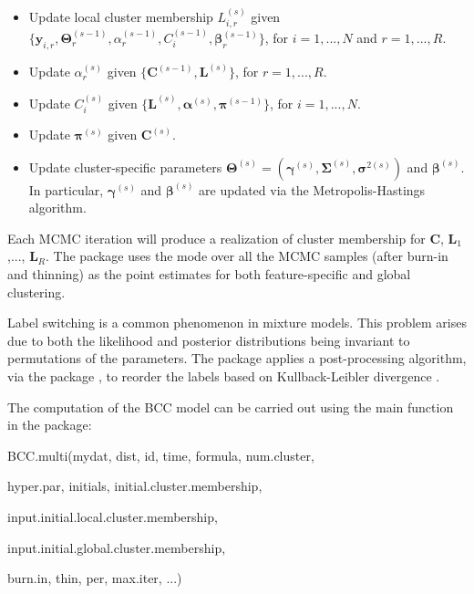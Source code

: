  \begin{itemize}

	\item Update local cluster membership $ L_{i,r}^{(s)}$ given $\{\boldsymbol{y}_{i,r}, \boldsymbol{\Theta}_r^{(s-1)}, \alpha_r^{(s-1)}, C_i^{(s-1)}, \boldsymbol{\beta}_r^{(s-1)} \}$, for $i=1,...,N$ and  $r=1,...,R$.

	\item Update $\alpha_r^{(s)}$ given $\{ \boldsymbol{C}^{(s-1)}, \boldsymbol{L}^{(s)} \}$, for $r=1,...,R$.

	\item Update $ C_i^{(s)}$ given $\{ \boldsymbol{L}^{(s)},  \boldsymbol{\alpha}^{(s)}, \boldsymbol{\pi}^{(s-1)}\}$, for $i=1,...,N$.

	\item Update $\boldsymbol{\pi}^{(s)}$ given $ \boldsymbol{C}^{(s)}$.

	\item Update cluster-specific parameters $\boldsymbol{\Theta}^{(s)} = (\boldsymbol{\gamma}^{(s)},\boldsymbol{\Sigma}^{(s)}, \boldsymbol{\sigma}^{2(s)})$ and  $\boldsymbol{\beta}^{(s)}$. In particular, $\boldsymbol{\gamma}^{(s)}$ and $\boldsymbol{\beta}^{(s)}$ are updated via the Metropolis-Hastings algorithm.

\end{itemize}

Each MCMC iteration will produce a realization of cluster membership for $\boldsymbol{C}$, $\boldsymbol{L}_1$,..., $\boldsymbol{L}_R$. The package uses the mode over all the MCMC samples (after burn-in and thinning) as the point estimates for both feature-specific and global clustering. 

Label switching is a common phenomenon in mixture models. This problem arises due to both the likelihood and posterior distributions being invariant to permutations of the parameters. The  package applies a post-processing algorithm, via the  package \citep{Papastamoulis2016}, to reorder the labels based on Kullback-Leibler divergence \citep{Stephens2000}.

The computation of the BCC model can be carried out using the main function in the   package: 

\begin{example}

BCC.multi(mydat, dist, id, time, formula, num.cluster,  

		 hyper.par, initials, initial.cluster.membership, 

		 input.initial.local.cluster.membership, 

		 input.initial.global.cluster.membership,

		 burn.in, thin, per, max.iter, ...)

\end{example}

